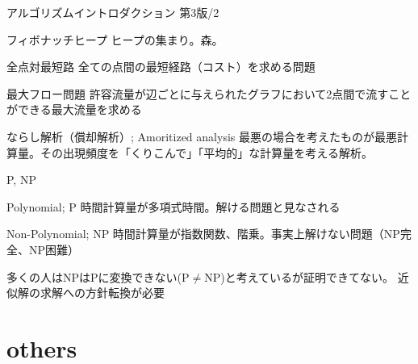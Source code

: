\documentclass{beamer}
\begin{document}
\begin{frame}[fragile]{アルゴリズムイントロダクション 第3版/2}{
\href{https://www.amazon.co.jp/アルゴリズムイントロダクション-第3版-総合版：世界標準MIT教科書-Thomas-Cormen-ebook/dp/B078WPYHGN/ref=sr_1_10}{}}

\begin{block}{フィボナッチヒープ}
ヒープの集まり。森。
\end{block}

\begin{block}{全点対最短路}
全ての点間の最短経路（コスト）を求める問題
\end{block}

\begin{block}{最大フロー問題}
許容流量が辺ごとに与えられたグラフにおいて2点間で流すことができる最大流量を求める
\end{block}

\begin{block}{ならし解析（償却解析）; Amoritized analysis}
最悪の場合を考えたものが最悪計算量。その出現頻度を「くりこんで」「平均的」な計算量を考える解析。
\end{block}

\end{frame}

\begin{frame}[fragile]{P, NP}{}
\begin{block}{Polynomial; P}
時間計算量が多項式時間。解ける問題と見なされる
\end{block}

\begin{block}{Non-Polynomial; NP}
時間計算量が指数関数、階乗。事実上解けない問題（NP完全、NP困難）
\end{block}

\vfill
多くの人はNPはPに変換できない(P$\neq$NP)と考えているが証明できてない。
\vfill
近似解の求解への方針転換が必要
\end{frame}


\section{others}		%
\subsection{}
\end{document}
